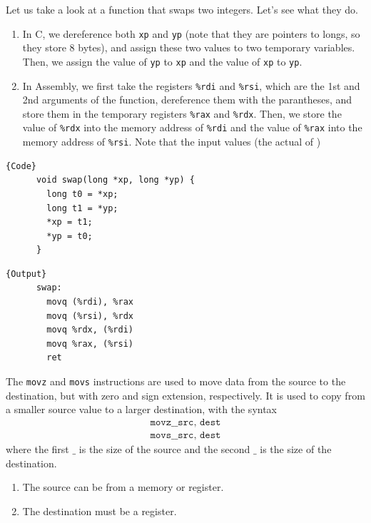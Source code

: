   \begin{example}
    Let us take a look at a function that swaps two integers. Let's see what they do. 
    \begin{enumerate}
      \item In C, we dereference both \texttt{xp} and \texttt{yp} (note that they are pointers to longs, so they store 8 bytes), and assign these two values to two temporary variables. Then, we assign the value of \texttt{yp} to \texttt{xp} and the value of \texttt{xp} to \texttt{yp}.
      \item In Assembly, we first take the registers \texttt{\%rdi} and \texttt{\%rsi}, which are the 1st and 2nd arguments of the function, dereference them with the parantheses, and store them in the temporary registers \texttt{\%rax} and \texttt{\%rdx}. Then, we store the value of \texttt{\%rdx} into the memory address of \texttt{\%rdi} and the value of \texttt{\%rax} into the memory address of \texttt{\%rsi}. Note that the input values (the actual of )
    \end{enumerate}

    \noindent\begin{minipage}{.5\textwidth}
    \begin{lstlisting}[]{Code}
      void swap(long *xp, long *yp) {
        long t0 = *xp;
        long t1 = *yp;
        *xp = t1;
        *yp = t0;
      }
    \end{lstlisting}
    \end{minipage}
    \hfill
    \begin{minipage}{.49\textwidth}
    \begin{lstlisting}[]{Output}
      swap:
        movq (%rdi), %rax
        movq (%rsi), %rdx
        movq %rdx, (%rdi)
        movq %rax, (%rsi)
        ret
    \end{lstlisting}
    \end{minipage}
  \end{example}

  \begin{definition}
    The \texttt{movz} and \texttt{movs} instructions are used to move data from the source to the destination, but with zero and sign extension, respectively. It is used to copy from a smaller source value to a larger destination, with the syntax 
    \begin{align*}
      \texttt{movz\_\_ src, dest} \\ 
      \texttt{movs\_\_ src, dest} 
    \end{align*}
    where the first $\_$ is the size of the source and the second $\_$ is the size of the destination. 
    \begin{enumerate}
      \item The source can be from a memory or register. 
      \item The destination must be a register. 
    \end{enumerate}
  \end{definition}

